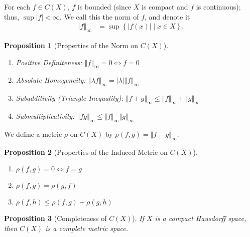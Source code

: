 \documentclass[10pt]{extarticle}
\newcommand{\norm}[1]{\left\Vert #1\right\Vert}
\newcommand{\set}[1]{\left\{#1\right\}}
\theoremstyle{plain}
\newtheorem*{proposition}{Proposition}
\theoremstyle{definition}
\theoremstyle{note}
\begin{document}
For each $f\in C(X)$, $f$ is bounded (since $X$ is compact and $f$ is continuous); thus, $\sup\left\vert f \right\vert < \infty$. We call this the norm of $f$, and denote it
\begin{align*}
  \norm{f}_{\infty} &= \sup\set{|f(x)|\mid x\in X}.
\end{align*}
\begin{proposition}[Properties of the Norm on $C(X)$]\hfill
  \begin{enumerate}[(1)]
    \item Positive Definiteness: $\displaystyle \norm{f}_{\infty} = 0 \Leftrightarrow f = 0$
    \item Absolute Homogeneity: $\displaystyle \norm{\lambda f}_{\infty} = |\lambda|\norm{f}_{\infty}$
    \item Subadditivity (Triangle Inequality): $\displaystyle \norm{f+g}_{\infty}\leq \norm{f}_{\infty} + \norm{g}_{\infty}$
    \item Submultiplicativity: $\displaystyle \norm{fg}_{\infty} \leq \norm{f}_{\infty} \norm{g}_{\infty}$
  \end{enumerate}
\end{proposition}
We define a metric $\rho$ on $C(X)$ by $\rho(f,g) = \norm{f-g}_{\infty}$.
\begin{proposition}[Properties of the Induced Metric on $C(X)$]\hfill
  \begin{enumerate}[(1)]
    \item $\displaystyle \rho(f,g) = 0 \Leftrightarrow f=g$
    \item $\displaystyle \rho(f,g) = \rho(g,f)$
    \item $\displaystyle \rho(f,h) \leq \rho(f,g) + \rho(g,h)$
  \end{enumerate}
\end{proposition}
\begin{proposition}[Completeness of $C(X)$]
  If $X$ is a compact Hausdorff space, then $C(X)$ is a complete metric space.
\end{proposition}
\end{document}
